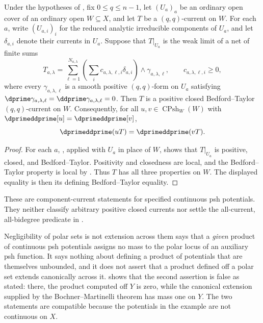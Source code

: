 \begin{corollary}
\label{cor:ch16-cpsh-local-weak-component-current}
Under the hypotheses of , fix
$0\leq q\leq n-1$, let $(U_a)_a$ be an ordinary open cover of an
ordinary open $W\subseteq X$, and let $T$ be a $(q,q)$-current on
$W$.  For each $a$, write $(U_{a,i})_i$ for the reduced analytic
irreducible components of $U_a$, and let $\delta_{a,i}$ denote their
currents in $U_a$.  Suppose that $T|_{U_a}$ is the weak limit of a net
of finite sums
\[
 T_{a,\lambda}=
 \sum_{\ell=1}^{N_{a,\lambda}}
 \left(\sum_i c_{a,\lambda,\ell,i}\delta_{a,i}\right)
 \wedge\gamma_{a,\lambda,\ell},
 \qquad c_{a,\lambda,\ell,i}\geq0,
\]
where every $\gamma_{a,\lambda,\ell}$ is a smooth positive
$(q,q)$-form on $U_a$ satisfying
$\dprime\gamma_{a,\lambda,\ell}=\ddprime\gamma_{a,\lambda,\ell}=0$.
Then $T$ is a positive closed Bedford--Taylor $(q,q)$-current on
$W$.  Consequently, for all $u,v\in\operatorname{CPsh}_W(W)$ with
$\dprimeddprime[u]=\dprimeddprime[v]$,
\[
                         \dprimeddprime(uT)=\dprimeddprime(vT).
\]
\end{corollary}

\begin{proof}
For each $a$, , applied with
$U_a$ in place of $W$, shows that $T|_{U_a}$ is positive, closed,
and Bedford--Taylor.  Positivity and closedness are local, and the
Bedford--Taylor property is local by .
Thus $T$ has all three properties on $W$.  The displayed equality is
then its defining Bedford--Taylor equality.
\end{proof}

These are component-current statements for specified continuous psh
potentials.  They neither classify arbitrary positive closed currents nor
settle the all-current, all-bidegree predicate in
.

\begin{warning}{Negligibility of polar sets is not extension across them}
 says that a \emph{given} product of
continuous psh potentials assigns no mass to the polar locus of an auxiliary
psh function.  It says nothing about defining a product of potentials that
are themselves unbounded, and it does not assert that a product defined off
a polar set extends canonically across it.
 shows that the second assertion is false as
stated: there, the product computed off $Y$ is zero, while the canonical
extension supplied by the Bochner--Martinelli theorem has mass one on $Y$.
The two statements are compatible because the potentials in the example are
not continuous on $X$.
\end{warning}

